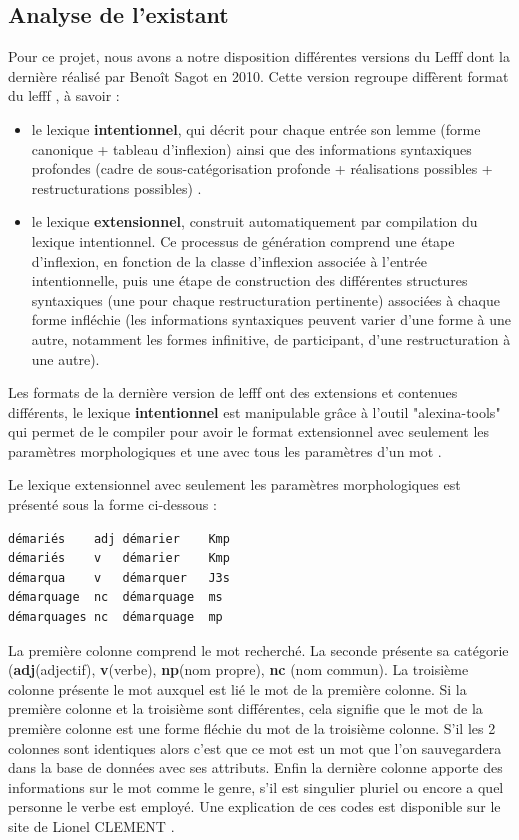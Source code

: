 \documentclass[12pt,a4paper]{article}
\begin{document}
\subsection{Analyse de l'existant}
Pour ce projet, nous avons a notre  disposition différentes versions  du Lefff  dont la dernière réalisé par Benoît Sagot en 2010. Cette version regroupe diffèrent format du lefff , à savoir \cite{lefff_int} :
\begin{itemize}
\item le lexique \textbf{intentionnel}, qui décrit pour chaque entrée son lemme (forme canonique + tableau d'inflexion) ainsi que des informations syntaxiques profondes (cadre de sous-catégorisation profonde + réalisations possibles + restructurations possibles) .
\item le lexique \textbf{extensionnel}, construit automatiquement par compilation du lexique intentionnel. Ce processus de génération comprend une étape d'inflexion, en fonction de la classe d'inflexion associée à l'entrée intentionnelle, puis une étape de construction des différentes structures syntaxiques (une pour chaque restructuration pertinente) associées à chaque forme infléchie (les informations syntaxiques peuvent varier d'une forme à une autre, notamment les formes infinitive, de participant, d'une restructuration à une autre).
\end{itemize} 

\smallbreak Les formats de la dernière version de lefff ont des extensions et contenues différents, le lexique \textbf{intentionnel} est manipulable grâce à l'outil "alexina-tools" qui permet de le compiler pour avoir le format extensionnel avec seulement les paramètres morphologiques et une avec tous les paramètres d'un mot .

Le lexique extensionnel avec seulement les paramètres morphologiques est présenté sous la forme ci-dessous :
\begin{verbatim}
démariés	adj	démarier	Kmp
démariés	v	démarier	Kmp
démarqua	v	démarquer	J3s
démarquage	nc	démarquage	ms
démarquages	nc	démarquage	mp
\end{verbatim}

\smallbreak La première colonne comprend le mot recherché. 
\smallbreak La seconde présente sa catégorie (\textbf{adj}(adjectif), \textbf{v}(verbe), \textbf{np}(nom propre), \textbf{nc} (nom commun).
\smallbreak La troisième colonne présente le mot auxquel est lié le mot de la première colonne.
Si la première colonne et la troisième sont différentes, cela signifie que le mot de la première colonne est une forme fléchie du mot de la troisième colonne. S'il les 2 colonnes sont identiques alors c'est que ce mot est un mot que l'on sauvegardera dans la base de données avec ses attributs.
Enfin la dernière colonne apporte des informations sur le mot comme le genre, s'il est singulier pluriel ou encore a quel personne le verbe est employé. Une explication de ces codes est disponible sur le site de Lionel CLEMENT \cite{tagset}.
\end{document}

